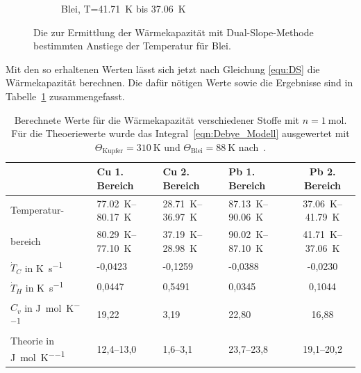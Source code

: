 \documentclass[parskip=half, a4paper,twoside,final]{article}
\begin{document}
\begin{figure}[ht!]
\begin{subfigure}[b!]{0.49\textwidth}
    \vspace{-1cm}
    \caption{Blei, T=\SI{41,71}{\kelvin} bis \SI{37,06}{\kelvin}}
    \end{subfigure}
  \caption{Die zur Ermittlung der Wärmekapazität mit Dual-Slope-Methode bestimmten Anstiege der Temperatur für Blei.}
  \label{fig:DS_LineareFits_Blei}
\end{figure}

\FloatBarrier
Mit den so erhaltenen Werten lässt sich jetzt nach Gleichung \eqref{equ:DS} die Wärmekapazität berechnen. Die dafür nötigen Werte sowie die Ergebnisse sind in Tabelle~\ref{tab:ergebnisseDS} zusammengefasst.

\begin{table}[htp]
  \caption{Berechnete Werte für die Wärmekapazität verschiedener Stoffe mit $n=\SI{1}{\mol}$. Für die Theoeriewerte wurde das Integral~\eqref{eqn:Debye_Modell} ausgewertet mit $\Theta_\text{Kupfer}=\SI{310}{\kelvin}$ und $\Theta_\text{Blei}=\SI{88}{\kelvin}$ nach~\cite{Fastowski}.}
  \label{tab:ergebnisseDS}
  \begin{tabular}{l l l l c}
    \toprule
     & Cu 1. Bereich & Cu 2. Bereich & Pb 1. Bereich & Pb 2. Bereich\\
    \midrule
    Temperatur- &\SIrange{77,02}{80,17}{\kelvin} & \SIrange{28,71}{36,97}{\kelvin} &\SIrange{87,13}{90,06}{\kelvin} & \SIrange{37.06}{41,79}{\kelvin}\\
    bereich&\SIrange{80,29}{77,10}{\kelvin} & \SIrange{37,19}{28,98}{\kelvin} &\SIrange{90,02}{87,10}{\kelvin} &\SIrange{41,71}{37,06}{\kelvin}\\
    $\dot{T}_C$ in \si{\kelvin\per\second} &-0,0423	&-0,1259	&-0,0388	& -0,0230\\
    $\dot{T}_H$ in \si{\kelvin\per\second} & 0,0447 &	0,5491	&0,0345&	0,1044\\
    \toprule
    $C_v$ in \si{\joule\per\mol\per\kelvin}& 19,22	& 3,19	& 22,80	& 16,88\\

    Theorie in \si{\joule\per\mol\per\kelvin}&12,4--13,0 &	1,6--3,1	&23,7--23,8	&19,1--20,2\\
    \bottomrule
  \end{tabular}
\end{table}
\end{document}
